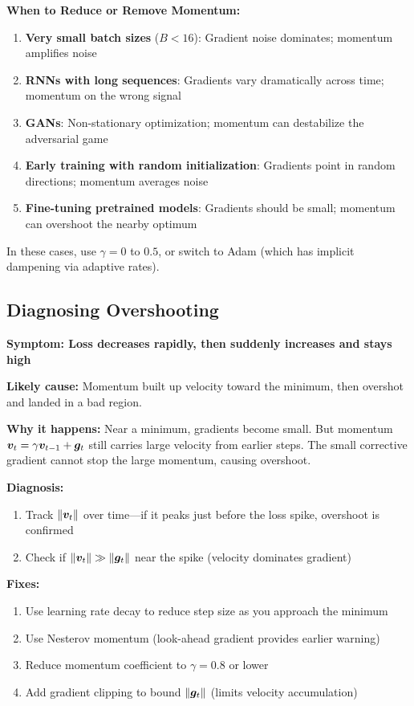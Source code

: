 \documentclass[../../main.tex]{subfiles}
\begin{document}
\begin{principle}
\textbf{When to Reduce or Remove Momentum:}

\begin{enumerate}
    \item \textbf{Very small batch sizes} ($B < 16$): Gradient noise dominates; momentum amplifies noise
    \item \textbf{RNNs with long sequences}: Gradients vary dramatically across time; momentum on the wrong signal
    \item \textbf{GANs}: Non-stationary optimization; momentum can destabilize the adversarial game
    \item \textbf{Early training with random initialization}: Gradients point in random directions; momentum averages noise
    \item \textbf{Fine-tuning pretrained models}: Gradients should be small; momentum can overshoot the nearby optimum
\end{enumerate}

In these cases, use $\gamma = 0$ to $0.5$, or switch to Adam (which has implicit dampening via adaptive rates).
\end{principle}

\subsection{Diagnosing Overshooting}

\begin{important}
\textbf{Symptom: Loss decreases rapidly, then suddenly increases and stays high}

\textbf{Likely cause:} Momentum built up velocity toward the minimum, then overshot and landed in a bad region.

\textbf{Why it happens:} Near a minimum, gradients become small. But momentum $\boldsymbol{v}_t = \gamma \boldsymbol{v}_{t-1} + \boldsymbol{g}_t$ still carries large velocity from earlier steps. The small corrective gradient cannot stop the large momentum, causing overshoot.

\textbf{Diagnosis:}
\begin{enumerate}
    \item Track $\left\lVert \boldsymbol{v}_t \right\rVert$ over time---if it peaks just before the loss spike, overshoot is confirmed
    \item Check if $\left\lVert \boldsymbol{v}_t \right\rVert \gg \left\lVert \boldsymbol{g}_t \right\rVert$ near the spike (velocity dominates gradient)
\end{enumerate}

\textbf{Fixes:}
\begin{enumerate}
    \item Use learning rate decay to reduce step size as you approach the minimum
    \item Use Nesterov momentum (look-ahead gradient provides earlier warning)
    \item Reduce momentum coefficient to $\gamma = 0.8$ or lower
    \item Add gradient clipping to bound $\left\lVert \boldsymbol{g}_t \right\rVert$ (limits velocity accumulation)
\end{enumerate}
\end{important}
\end{document}
